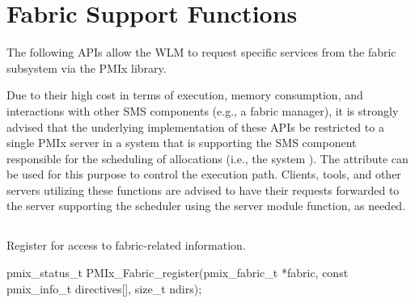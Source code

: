 \section{Fabric Support Functions}

The following \acp{API} allow the \ac{WLM} to request specific services from the fabric subsystem via the \ac{PMIx} library.

\advicermstart
Due to their high cost in terms of execution, memory consumption, and interactions with other \ac{SMS} components (e.g., a fabric manager), it is strongly advised that the underlying implementation of these \acp{API} be restricted to a single \ac{PMIx} server in a system that is supporting the \ac{SMS} component responsible for the scheduling of allocations (i.e., the system ). The  attribute can be used for this purpose to control the execution path. Clients, tools, and other servers utilizing these functions are advised to have their requests forwarded to the server supporting the scheduler using the  server module function, as needed.
\advicermend

\subsection{}

\summary

Register for access to fabric-related information.

\format

\cspecificstart
\begin{codepar}
pmix_status_t
PMIx_Fabric_register(pmix_fabric_t *fabric,
                     const pmix_info_t directives[],
                     size_t ndirs);
\end{codepar}
\cspecificend

\begin{arglist}
\end{arglist}

